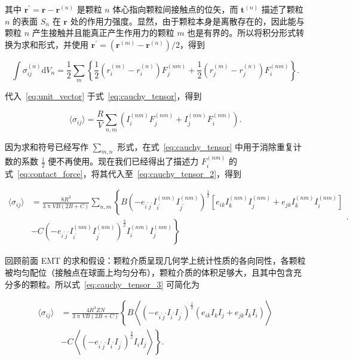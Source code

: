 其中 $\mathbf{r}^{\prime} = \mathbf{r} - \mathbf{r}^{(n)} $ 是颗粒 $n$ 体心指向颗粒间接触点的位矢，而 $\mathbf{t}^{(n)}$ 描述了颗粒 $n$ 的表面 $S_{n}$ 在 $\mathbf{r}$ 处的作用力强度。显然，由于颗粒本身是离散存在的，因此能与颗粒 $n$ 产生接触并且能真正产生作用力的颗粒 $m$ 也是有界的。所以将积分形式转换为求和形式，并使用 $\mathbf{r}^{\prime} = \left(\mathbf{r}^{(m)} - \mathbf{r}^{(n)}\right)/2$，得到

\begin{equation}
  \int\sigma_{ij}^{(n)}\mathrm{d}V_{n} = \frac{1}{2}\sum_{m}\left\{\frac{1}{2}\left(r_{i}^{(m)} - r_{i}^{(n)}\right)F_{j}^{(nm)} + \frac{1}{2}\left(r_{j}^{(m)} - r_{j}^{(n)}\right)F_{i}^{(nm)}\right\}\label{eq:cauchy_tensor}.
\end{equation}

代入~\eqref{eq:unit_vector} 于式~\eqref{eq:cauchy_tensor}，得到

\begin{equation}
  \langle\sigma_{ij}\rangle = \frac{R}{V}\sum_{n,m}\left(I_{i}^{(nm)}F_{j}^{(nm)} + I_{j}^{(nm)}F_{i}^{(nm)}\right)\label{eq:cauchy_tensor_2}.
\end{equation}

因为求和符号已经写作 $\sum_{m,n}$ 形式，在式~\eqref{eq:cauchy_tensor} 中用于消除重复计数的系数 $\frac{1}{2}$ 便不再使用。现在我们已经得出了描述力 $F_{i}^{(nm)}$ 的式~\eqref{eq:contact_force}，将其代入至~\eqref{eq:cauchy_tensor_2}，得到

\begin{equation}
  \begin{aligned}
    \langle\sigma_{ij}\rangle &= \frac{8R^{3}}{3\uppi VB(2B+C)}\sum_{n,m}\left\{B\left(-e_{i^{\prime}j^{\prime}}I_{i^{\prime}}^{(nm)}I_{j^{\prime}}^{(nm)}\right)^{\frac{1}{2}}\left[e_{ik}I_{k}^{(nm)}I_{j}^{(nm)} + e_{jk}I_{k}^{(nm)}I_{i}^{(nm)}\right]\right.\\
    &-\left. C\left(-e_{i^{\prime}j^{\prime}}I_{i^{\prime}}^{(nm)}I_{j^{\prime}}^{(nm)}\right)^{\frac{3}{2}}I_{i}^{(nm)}I_{j}^{(nm)}\right\}
  \end{aligned}\label{eq:cauchy_tensor_3}.
\end{equation}

回顾前面 EMT 的求和假设：颗粒介质呈现几何学上统计性质的各向同性，各颗粒被均匀配位（接触点在球面上均匀分布），颗粒介质的体积足够大，且其中包含充分多的颗粒。所以式~\eqref{eq:cauchy_tensor_3} 可简化为

\begin{equation}
  \begin{aligned}
  \langle\sigma_{ij}\rangle &= \frac{4R^{3}ZN}{3\uppi VB(2B+C)}\left\{B\left\langle(-e_{i^{\prime}j^{\prime}}I_{i^{\prime}}I_{j^{\prime}})^{\frac{1}{2}}(e_{ik}I_{k}I_{j} + e_{jk}I_{k}I_{i})\right\rangle\right.\\
  &-\left.C\left\langle(-e_{i^{\prime}j^{\prime}}I_{i^{\prime}}I_{j^{\prime}})^{\frac{3}{2}}I_{i}I_{j}\right\rangle\right\}.
  \end{aligned}\label{eq:cauchy_tensor_4}
\end{equation}

